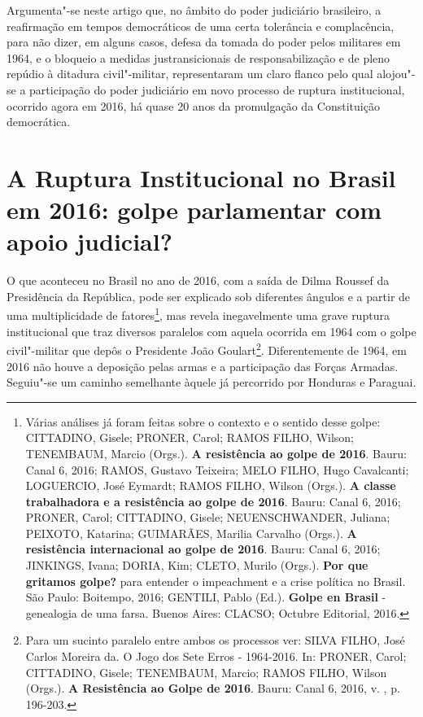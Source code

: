 Argumenta"-se neste artigo que, no âmbito do poder judiciário brasileiro,
a reafirmação em tempos democráticos de uma certa tolerância e
complacência, para não dizer, em alguns casos, defesa da tomada do poder
pelos militares em 1964, e o bloqueio a medidas justransicionais de
responsabilização e de pleno repúdio à ditadura civil"-militar,
representaram um claro flanco pelo qual alojou"-se a participação do
poder judiciário em novo processo de ruptura institucional, ocorrido
agora em 2016, há quase 20 anos da promulgação da Constituição
democrática.

\section{A Ruptura Institucional no Brasil em 2016: golpe parlamentar
com apoio judicial?}

O que aconteceu no Brasil no ano de 2016, com a saída de Dilma Roussef
da Presidência da República, pode ser explicado sob diferentes ângulos e
a partir de uma multiplicidade de fatores\footnote{Várias análises já
  foram feitas sobre o contexto e o sentido desse golpe: CITTADINO,
  Gisele; PRONER, Carol; RAMOS FILHO, Wilson; TENEMBAUM, Marcio (Orgs.).
  \textbf{A resistência ao golpe de 2016}. Bauru: Canal 6, 2016; RAMOS,
  Gustavo Teixeira; MELO FILHO, Hugo Cavalcanti; LOGUERCIO, José
  Eymardt; RAMOS FILHO, Wilson (Orgs.). \textbf{A classe trabalhadora e
  a resistência ao golpe de 2016}. Bauru: Canal 6, 2016; PRONER, Carol;
  CITTADINO, Gisele; NEUENSCHWANDER, Juliana; PEIXOTO, Katarina;
  GUIMARÃES, Marilia Carvalho (Orgs.). \textbf{A resistência
  internacional ao golpe de 2016}. Bauru: Canal 6, 2016; JINKINGS,
  Ivana; DORIA, Kim; CLETO, Murilo (Orgs.). \textbf{Por que gritamos
  golpe?} para entender o impeachment e a crise política no Brasil. São
  Paulo: Boitempo, 2016; GENTILI, Pablo (Ed.). \textbf{Golpe en Brasil}
  - genealogia de uma farsa. Buenos Aires: CLACSO; Octubre Editorial,
  2016.}, mas revela inegavelmente uma grave ruptura institucional que
traz diversos paralelos com aquela ocorrida em 1964 com o golpe
civil"-militar que depôs o Presidente João Goulart\footnote{Para um
  sucinto paralelo entre ambos os processos ver: SILVA FILHO, José
  Carlos Moreira da. O Jogo dos Sete Erros - 1964-2016. In: PRONER,
  Carol; CITTADINO, Gisele; TENEMBAUM, Marcio; RAMOS FILHO, Wilson
  (Orgs.). \textbf{A Resistência ao Golpe de 2016}. Bauru: Canal 6,
  2016, v. , p. 196-203.}. Diferentemente de 1964, em 2016 não houve a
deposição pelas armas e a participação das Forças Armadas. Seguiu"-se um
caminho semelhante àquele já percorrido por Honduras e Paraguai.


